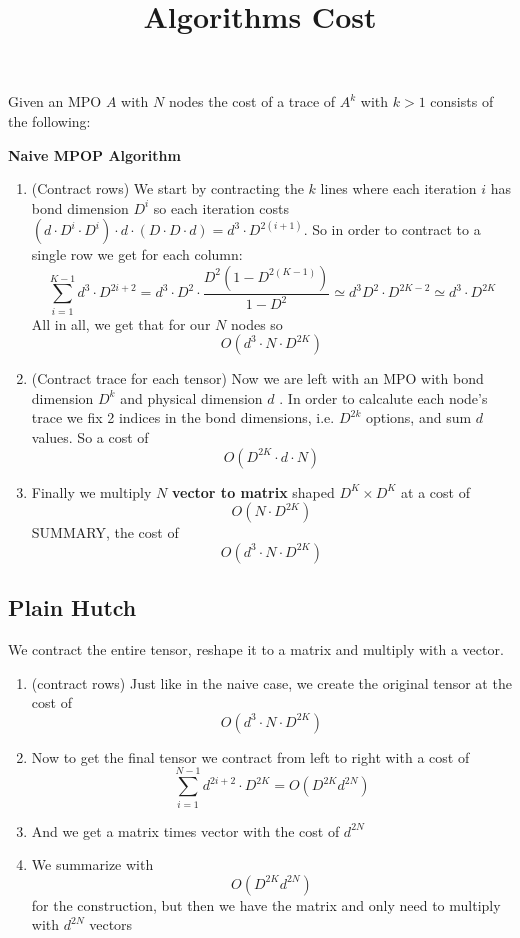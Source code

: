 \documentclass[12pt]{article}
\begin{document}
 
 
\title{Algorithms Cost}

\maketitle
Given an MPO $A$ with $N$ nodes the cost of a trace of $A^k$  with $k>1$ consists of the following:

\textbf{Naive MPOP Algorithm}
\begin{enumerate}
    \item (Contract rows) We start by contracting the $k$  lines where each iteration $i$  has bond dimension $D^i$ so each iteration costs $(d\cdot D^i \cdot D^i) \cdot d \cdot (D \cdot D \cdot d)= d^3 \cdot D^{2(i+1)}$. So in order to contract to a single row we get for each column: $$\sum_{i=1}^{K-1} d^3\cdot D^{2i+2}=d^3\cdot D^2\cdot \frac{D^2(1-D^{2(K-1)})}{1-D^2}\simeq d^3 D^2\cdot D^{2K-2}\simeq d^3\cdot D^{2K}$$All in all, we get that for our $N$ nodes so $$O(d^3\cdot N\cdot D^{2K})$$
    \item (Contract trace for each tensor) Now we are left with an MPO with bond dimension $D^k$  and physical dimension $d$ . In order to calcalute each node's trace we fix 2 indices in the bond dimensions, i.e. $D^{2k}$  options, and sum $d$  values.
    So a cost of $$O(D^{2K}\cdot d\cdot N)$$
    \item Finally we multiply $N$  \textbf{vector to matrix} shaped $D^K\times D^K$ at a cost of $$O(N\cdot D^{2K})$$ SUMMARY, the cost of $$O(d^3\cdot N\cdot D^{2K})$$ 
\end{enumerate} 

\subsection{Plain Hutch}
We contract the entire tensor, reshape it to a matrix and multiply with a vector.
\begin{enumerate}
    \item (contract rows) Just like in the naive case, we create the original tensor at the cost of $$O(d^3\cdot N\cdot D^{2K})$$
    \item Now to get the final tensor we contract from left to right with a cost of $$\sum_{i=1}^{N-1} d^{2i+2}\cdot D^{2K}=O(D^{2K}d^{2N})$$
    \item And we get a matrix times vector with the cost of $d^{2N}$ 
    \item We summarize with $$O(D^{2K}d^{2N})$$
for the construction, but then we have the matrix and only need to multiply with $d^{2N}$ vectors
\end{enumerate} 
\end{document}
